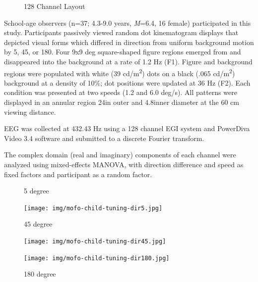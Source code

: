 \documentclass[landscape,final,paperwidth=72in,paperheight=41.5in,fontscale=0.285]{baposter}
\begin{document}
\begin{poster}
{\begin{figure}
\par
128 Channel Layout
\end{figure}
School-age observers (n=37; 4.3-9.0 years, \emph{M}=6.4, 16 female) participated in this study.  Participants passively viewed random dot kinematogram displays that depicted visual forms which differed in direction from uniform background motion by 5\degree, 45\degree, or 180\degree. Four 9x9 deg square-shaped figure regions emerged from and disappeared into the background at a rate of 1.2 Hz (F1). Figure and background regions were populated with white (39 cd/m\textsuperscript{2}) dots on a black (.065 cd/m\textsuperscript{2}) background at a density of 10\%; dot positions were updated at 36 Hz (F2). Each condition was presented at two speeds (1.2 and 6.0 deg/s). All patterns were displayed in an annular region 24\degree in outer and 4.8\degree inner diameter at the 60 cm viewing distance. 
\par    
EEG was collected at 432.43 Hz using a 128 channel EGI system and PowerDiva Video 3.4 software and submitted to a discrete Fourier transform. 
\par
The complex domain (real and imaginary) components of each channel were analyzed using mixed-effects MANOVA, with direction difference and speed as fixed factors and participant as a random factor.  
\par  
      }
    {
\vspace{-1.3em}    %
\begin{figure}[H]
  \centering
  \caption{5 degree}\label{mofo-child-tuning-dir5.jpg}
  \texttt{[image: img/mofo-child-tuning-dir5.jpg]}
  \caption{45 degree}\label{mofo-child-tuning-dir45.jpg}
  \texttt{[image: img/mofo-child-tuning-dir45.jpg]}
  \caption{180 degree}\label{mofo-child-tuning-dir180.jpg}
  \texttt{[image: img/mofo-child-tuning-dir180.jpg]}
\end{figure}      
    }

\end{poster}
\end{document}
